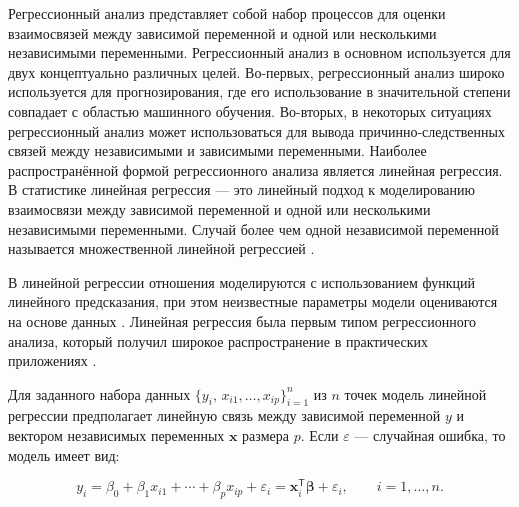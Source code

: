 Регрессионный анализ представляет собой набор процессов для оценки взаимосвязей между зависимой переменной и одной или несколькими независимыми переменными. Регрессионный анализ в основном используется для двух концептуально различных целей. Во-первых, регрессионный анализ широко используется для прогнозирования, где его использование в значительной степени совпадает с областью машинного обучения. Во-вторых, в некоторых ситуациях регрессионный анализ может использоваться для вывода причинно-следственных связей между независимыми и зависимыми переменными. Наиболее распространённой формой регрессионного анализа является линейная регрессия. В статистике линейная регрессия --- это линейный подход к моделированию взаимосвязи между зависимой переменной и одной или несколькими независимыми переменными. Случай более чем одной независимой переменной называется множественной линейной регрессией \autocite{freedman2009statistical}. 

В линейной регрессии отношения моделируются с использованием функций линейного предсказания, при этом неизвестные параметры модели оцениваются на основе данных \autocite{SEAL1967}. Линейная регрессия была первым типом регрессионного анализа, который получил широкое распространение в практических приложениях \autocite{yan2009linear}. 

Для заданного набора данных $\{y_{i},\,x_{i1},\ldots,x_{ip}\}_{i=1}^{n}$ из $n$ точек модель линейной регрессии предполагает линейную связь между зависимой переменной $y$ и вектором независимых переменных $\textbf{x}$ размера $p$. Если $\varepsilon$ --- случайная ошибка, то модель имеет вид:

\begin{equation}
\label{eq:linreg}
y_{i}=\beta_{0} + \beta_{1} x_{i1} + \cdots + \beta_{p} x_{ip} + \varepsilon_{i} = \mathbf{x}_{i}^{\mathsf{T}}{\boldsymbol{\beta}} + \varepsilon_{i}, \qquad i = 1, \ldots, n.
\end{equation}


